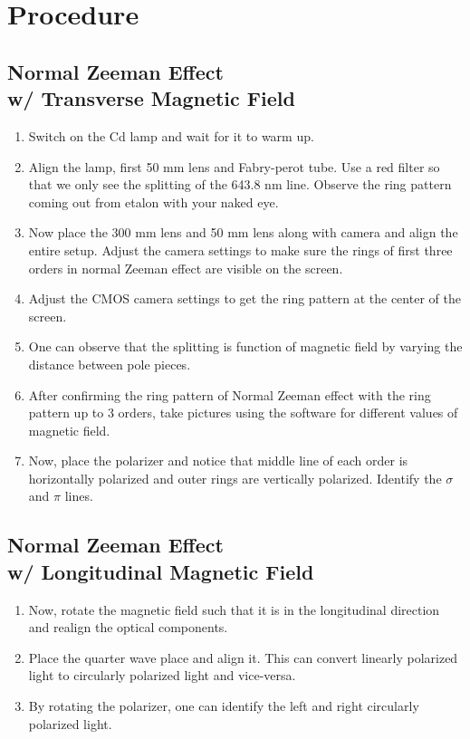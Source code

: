 \section{Procedure}

\subsection{Normal Zeeman Effect\\w/ Transverse Magnetic Field}

\begin{enumerate}
    \item Switch on the Cd lamp and wait for it to warm up.
    \item Align the lamp, first 50 mm lens and Fabry-perot tube. Use a red filter so that we only see the splitting of the 643.8 nm line. Observe the ring pattern coming out from etalon with your naked eye.
    \item Now place the 300 mm lens and 50 mm lens along with camera and align the entire setup. Adjust the camera settings to make sure the rings of first three orders in normal Zeeman effect are visible on the screen.
    \item Adjust the CMOS camera settings to get the ring pattern at the
    center of the screen. 
    \item One can observe that the splitting is function of magnetic field by varying the distance between pole pieces. 
    \item After confirming the ring pattern of Normal Zeeman effect with the ring pattern
    up to 3 orders, take pictures using the software for different values of magnetic field.
    \item Now, place the polarizer and notice that middle line of each order is horizontally
    polarized and outer rings are vertically polarized. Identify the $\sigma$ and $\pi$ lines. 
\end{enumerate}

\subsection{Normal Zeeman Effect\\w/ Longitudinal Magnetic Field}

\begin{enumerate}
    \item Now, rotate the magnetic field such that it is in the longitudinal direction and realign the optical components.
    \item Place the quarter wave place and align it. This can convert linearly polarized light to circularly polarized light and vice-versa.
    \item By rotating the polarizer, one can identify the left and right circularly polarized light.
\end{enumerate}

